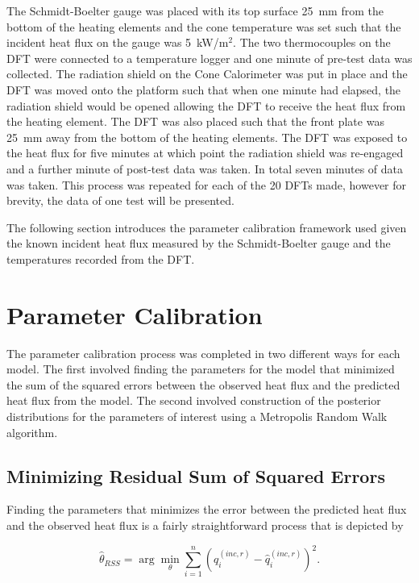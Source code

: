 \documentclass[article]{proc}
\begin{document}
    The Schmidt-Boelter gauge was placed with its top surface 25~mm from the bottom of the heating elements and the cone temperature was set such that the incident heat flux on the gauge was 5~kW/m$^2$. The two thermocouples on the DFT were connected to a temperature logger and one minute of pre-test data was collected. The radiation shield on the Cone Calorimeter was put in place and the DFT was moved onto the platform such that when one minute had elapsed, the radiation shield would be opened allowing the DFT to receive the heat flux from the heating element. The DFT was also placed such that the front plate was 25~mm away from the bottom of the heating elements. The DFT was exposed to the heat flux for five minutes at which point the radiation shield was re-engaged and a further minute of post-test data was taken. In total seven minutes of data was taken. This process was repeated for each of the 20 DFTs made, however for brevity, the data of one test will be presented. 

    The following section introduces the parameter calibration framework used given the known incident heat flux measured by the Schmidt-Boelter gauge and the temperatures recorded from the DFT. 

\section{Parameter Calibration}

    The parameter calibration process was completed in two different ways for each model. The first involved finding the parameters for the model that minimized the sum of the squared errors between the observed heat flux and the predicted heat flux from the model. The second involved construction of the posterior distributions for the parameters of interest using a Metropolis Random Walk algorithm. 

    \subsection{Minimizing Residual Sum of Squared Errors}

        Finding the parameters that minimizes the error between the predicted heat flux and the observed heat flux is a fairly straightforward process that is depicted by

        \begin{equation}\label{eq:rss}
            \hat{\theta}_{RSS} = \arg \min_{\theta}  \sum_{i=1}^n \left(q_i^{(inc,r)} - \hat{q}_i^{(inc,r)} \right)^2.
        \end{equation}
\end{document}

